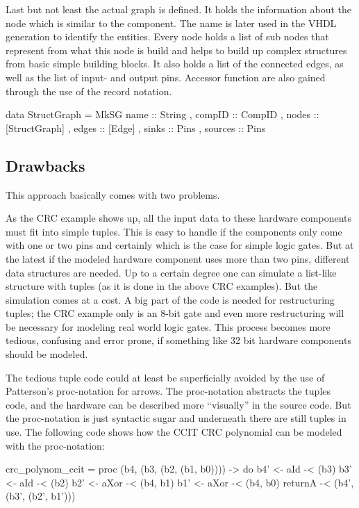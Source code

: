 \documentclass[11pt,final,a4paper]{article}
\begin{document}
 
Last but not least the actual graph is defined. It holds the information about the node which is similar to the component. The name is later
used in the VHDL generation to identify the entities. Every node holds a list of sub nodes that represent from what this node is build and
helps to build up complex structures from basic simple building blocks. It also holds a list of the connected edges, as well as the list of
input- and output pins. Accessor function are also gained through the use of the record notation.
\begin{haskell}
data StructGraph
  = MkSG { name    :: String
         , compID  :: CompID
         , nodes   :: [StructGraph]
         , edges   :: [Edge]
         , sinks   :: Pins
         , sources :: Pins }   
\end{haskell}

\subsection{Drawbacks}

This approach basically comes with two problems. 

As the CRC example shows up, all the input data to these hardware components must fit into simple tuples. This is easy to handle if the
components only come with one or two pins and certainly which is the case for simple logic gates. But at the latest if the modeled
hardware component uses more than two pins, different data structures are needed. Up to a certain degree one can simulate a
list-like structure with tuples (as it is done in the above CRC examples). But the simulation comes at a cost. 
A big part of the code is needed for restructuring tuples; the CRC example only is an $8$-bit gate and even more restructuring
will be necessary for modeling real world logic gates. This process becomes more tedious, confusing and error prone, if something
like 32 bit hardware components should be modeled. 

The tedious tuple code could at least be superficially avoided by the use of Patterson's  proc-notation for
arrows\cite{PatersonNewNotation}.  The proc-notation abstracts the tuples code, and the hardware can be described more ``visually'' in the
source code. But the proc-notation is just syntactic sugar and underneath there are still tuples in use. 
The following code shows how the CCIT CRC polynomial can be modeled with the proc-notation: 
\begin{haskell}
crc_polynom_ccit 
 = proc (b4, (b3, (b2, (b1, b0)))) -> do
     b4' <- aId  -< (b3)
     b3' <- aId  -< (b2)
     b2' <- aXor -< (b4, b1)
     b1' <- aXor -< (b4, b0)
     returnA     -< (b4', (b3', (b2', b1')))
\end{haskell} 
\end{document}
